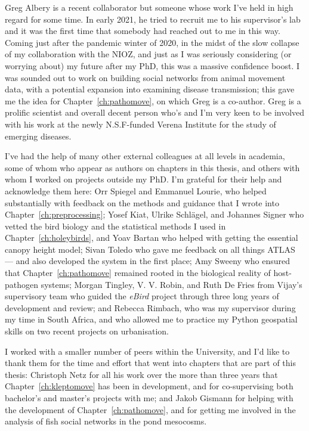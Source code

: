 \noindent Greg Albery is a recent collaborator but someone whose work I've held in high regard for some time.
In early 2021, he tried to recruit me to his supervisor's lab and it was the first time that somebody had reached out to me in this way. 
Coming just after the pandemic winter of 2020, in the midst of the slow collapse of my collaboration with the NIOZ, and just as I was seriously considering (or worrying about) my future after my PhD, this was a massive confidence boost.
I was sounded out to work on building social networks from animal movement data, with a potential expansion into examining disease transmission; this gave me the idea for Chapter~\ref{ch:pathomove}, on which Greg is a co-author.
Greg is a prolific scientist and overall decent person who's and I'm very keen to be involved with his work at the newly N.S.F-funded Verena Institute for the study of emerging diseases.

\noindent I've had the help of many other external colleagues at all levels in academia, some of whom who appear as authors on chapters in this thesis, and others with whom I worked on projects outside my PhD.
I'm grateful for their help and acknowledge them here:
Orr Spiegel and Emmanuel Lourie, who helped substantially with feedback on the methods and guidance that I wrote into Chapter~\ref{ch:preprocessing};
Yosef Kiat, Ulrike Schl{\"a}gel, and Johannes Signer who vetted the bird biology and the statistical methods I used in Chapter~\ref{ch:holeybirds}, and Yoav Bartan who helped with getting the essential canopy height model;
Sivan Toledo who gave me feedback on all things ATLAS --- and also developed the system in the first place;
Amy Sweeny who ensured that Chapter~\ref{ch:pathomove} remained rooted in the biological reality of host-pathogen systems;
Morgan Tingley, V. V. Robin, and Ruth De Fries from Vijay's supervisory team who guided the \textit{eBird} project through three long years of development and review;
and Rebecca Rimbach, who was my supervisor during my time in South Africa, and who allowed me to practice my Python geospatial skills on two recent projects on urbanisation.

I worked with a smaller number of peers within the University, and I'd like to thank them for the time and effort that went into chapters that are part of this thesis:
Christoph Netz for all his work over the more than three years that Chapter~\ref{ch:kleptomove} has been in development, and for co-supervising both bachelor's and master's projects with me;
and Jakob Gismann for helping with the development of Chapter~\ref{ch:pathomove}, and for getting me involved in the analysis of fish social networks in the pond mesocosms.

